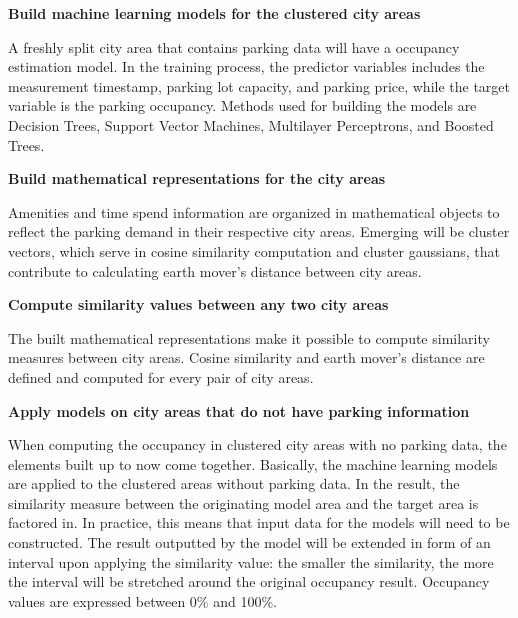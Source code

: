 \begin{romanlist}
		\item{\textbf{Build machine learning models for the clustered city areas}}
		
		A freshly split city area that contains parking data will have a occupancy estimation model. In the training process, the predictor variables includes the measurement timestamp, parking lot capacity, and parking price, while the target variable is the parking occupancy. Methods used for building the models are Decision Trees, Support Vector Machines, Multilayer Perceptrons, and Boosted Trees.
		
		\item{\textbf{Build mathematical representations for the city areas}}
		
		Amenities and time spend information are organized in mathematical objects to reflect the parking demand in their respective city areas. Emerging will be cluster vectors, which serve in cosine similarity computation and cluster gaussians, that contribute to calculating earth mover's distance between city areas.

		\item{\textbf{Compute similarity values between any two city areas}}
		
		The built mathematical representations make it possible to compute similarity measures between city areas. Cosine similarity and earth mover's distance are defined and computed for every pair of city areas.
		
		\item{\textbf{Apply models on city areas that do not have parking information}}
		
		When computing the occupancy in clustered city areas with no parking data, the elements built up to now come together. Basically, the machine learning models are applied to the clustered areas without parking data. In the result, the similarity measure between the originating model area and the target area is factored in. In practice, this means that input data for the models will need to be constructed. The result outputted by the model will be extended in form of an interval upon applying the similarity value: the smaller the similarity, the more the interval will be stretched around the original occupancy result. Occupancy values are expressed between 0\% and 100\%.
		
	\end{romanlist}
	
